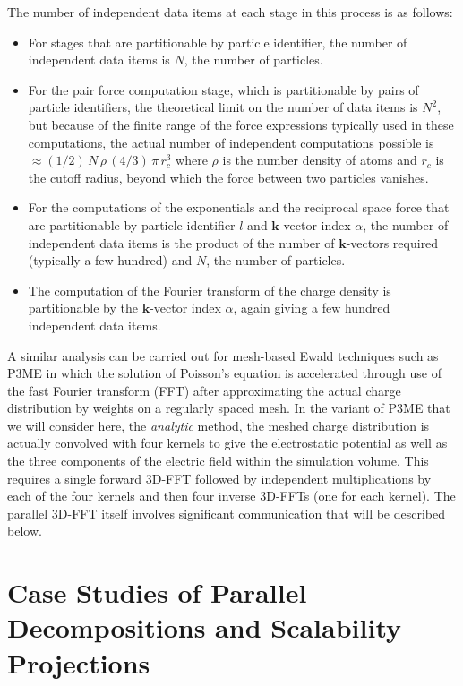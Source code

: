 \documentclass[doublespacing]{elsart}
\begin{document}
The number of independent data items at each stage in this process is
as follows:
\begin{itemize}
\item For stages that are partitionable by particle identifier,
the number of independent data items is $N$, the number of particles.
\item For the pair force computation stage, which is partitionable by
pairs of particle identifiers, the theoretical limit on the number of
data items is $N^2$, but because of the finite range of the force
expressions typically used in these computations, the actual number of
independent computations possible is $\approx
(1/2)\,N\,\rho\,(4/3)\,\pi\,r_c^3$ where $\rho$ is the number density
of atoms and $r_c$ is the cutoff radius, beyond which the force between
two particles vanishes.
\item For the computations of the exponentials and the reciprocal
space force that are partitionable by particle identifier $l$
and $\mathbf{k}$-vector index $\alpha$, the number of independent data
items is the product of the number of $\mathbf{k}$-vectors required
(typically a few hundred) and $N$, the number of particles.
\item The computation of the Fourier transform of the charge density
is partitionable by the $\mathbf{k}$-vector index $\alpha$, again
giving a few hundred independent data items.
\end{itemize}

A similar analysis can be carried out for mesh-based Ewald techniques
such as P3ME in which the solution of Poisson's equation is
accelerated through use of the fast Fourier transform (FFT) after
approximating the actual charge distribution by weights on a regularly
spaced mesh.  In the variant of P3ME that we will consider here, the
{\em analytic} method, the meshed charge distribution is actually
convolved with four kernels to give the electrostatic potential as
well as the three components of the electric field within the
simulation volume.  This requires a single forward 3D-FFT followed by
independent multiplications by each of the four kernels and then four
inverse 3D-FFTs (one for each kernel).  The parallel 3D-FFT itself
involves significant communication that will be described below.

\section{Case Studies of Parallel Decompositions and Scalability Projections}
\end{document}
